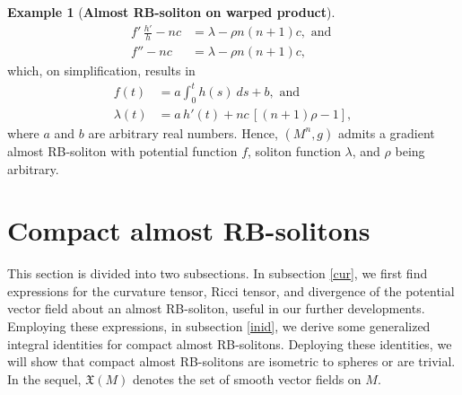 \documentclass[a4paper, twoside, 10pt]{article}
\numberwithin{equation}{section}
\theoremstyle{definition}
\newtheorem{example}{Example}[section]
\begin{document}
\begin{example}[{\bf Almost RB-soliton on warped product}]
\begin{align}
    f'\,\frac{h'}{h}- nc&=\lambda -\rho n(n+1)c, \text{  and  }\\
    f'' -nc&= \lambda -\rho n(n+1)c,
\end{align}
which, on simplification, results in
\begin{align}
    f(t)&=a \int_0^th(s) \ ds+b, \text{  and  } \\
    \lambda(t)&=a\,h'(t)+ nc\,[(n+1)\rho-1],
\end{align}
where $a$ and $b$ are arbitrary real numbers.
Hence, $(M^n,g)$ admits a gradient almost RB-soliton with potential function $f$, soliton function $\lambda$, and $\rho $ being arbitrary.
\end{example}
\vspace{0.1in}



 


 
\section{Compact almost RB-solitons}\label{crb}	 
This section is divided into two subsections. 
In subsection \ref{cur}, we first find expressions for the curvature tensor, Ricci tensor, and divergence of the potential vector field about an almost RB-soliton, useful in our further developments. Employing these 
expressions, in subsection \ref{inid}, we derive some generalized integral identities for compact almost RB-solitons. Deploying these identities, we will show that compact almost RB-solitons are isometric to spheres or are trivial.\\

\noindent 
In the sequel, $\mathfrak{X}(M)$ denotes the set of smooth vector fields on $M$. 
\end{document}
